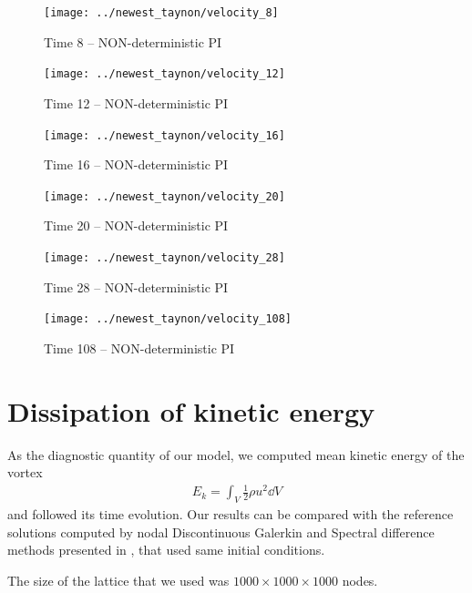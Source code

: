 \begin{figure}[H]
 \centering 
 \texttt{[image: ../newest\_taynon/velocity\_8]}
 \label{transitions}
 \caption{Time 8 -- NON-deterministic PI}
\end{figure}

\begin{figure}[H]
 \centering 
 \texttt{[image: ../newest\_taynon/velocity\_12]}
 \label{transitions}
 \caption{Time 12 -- NON-deterministic PI}
\end{figure}


\begin{figure}[H]
 \centering 
 \texttt{[image: ../newest\_taynon/velocity\_16]}
 \label{transitions}
 \caption{Time 16 -- NON-deterministic PI}
\end{figure}

\begin{figure}[H]
 \centering 
 \texttt{[image: ../newest\_taynon/velocity\_20]}
 \label{transitions}
 \caption{Time 20 -- NON-deterministic PI}
\end{figure}


\begin{figure}[H]
 \centering 
 \texttt{[image: ../newest\_taynon/velocity\_28]}
 \label{transitions}
 \caption{Time 28 -- NON-deterministic PI}
\end{figure}


\begin{figure}[H]
 \centering 
 \texttt{[image: ../newest\_taynon/velocity\_108]}
 \label{transitions}
 \caption{Time 108 -- NON-deterministic PI}
\end{figure}

\section{Dissipation of kinetic energy}
As the diagnostic quantity of our model, we computed mean kinetic energy of the vortex
\begin{align*}
E_k = \int_V \frac{1}{2}\rho u^2 \dd V
\end{align*}
and followed its time evolution.
Our results can be compared with the reference solutions computed by nodal Discontinuous Galerkin and Spectral difference methods presented in \cite{tgvref}, that used same initial conditions.

The size of the lattice that we used was  $1000 \times 1000 \times 1000$ nodes.

